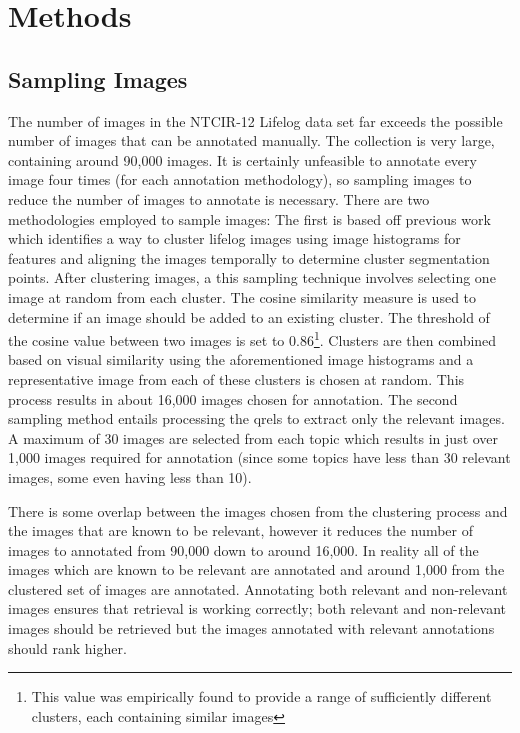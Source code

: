 \chapter{Methods}

\section{Sampling Images}

The number of images in the NTCIR-12 Lifelog data set far exceeds the possible number of images that can be annotated manually. The collection is very large, containing around 90,000 images. It is certainly unfeasible to annotate every image four times (for each annotation methodology), so sampling images to reduce the number of images to annotate is necessary. There are two methodologies employed to sample images: The first is based off previous work~\cite{scells2016qut} which identifies a way to cluster lifelog images using image histograms for features and aligning the images temporally to determine cluster segmentation points. After clustering images, a this sampling technique involves selecting one image at random from each cluster. The cosine similarity measure is used to determine if an image should be added to an existing cluster. The threshold of the cosine value between two images is set to 0.86\footnote{This value was empirically found to provide a range of sufficiently different clusters, each containing similar images}. Clusters are then combined based on visual similarity using the aforementioned image histograms and a representative image from each of these clusters is chosen at random. This process results in about 16,000 images chosen for annotation. The second sampling method entails processing the qrels to extract only the relevant images. A maximum of 30 images are selected from each topic which results in just over 1,000 images required for annotation (since some topics have less than 30 relevant images, some even having less than 10).

There is some overlap between the images chosen from the clustering process and the images that are known to be relevant, however it reduces the number of images to annotated from 90,000 down to around 16,000. In reality all of the images which are known to be relevant are annotated and around 1,000 from the clustered set of images are annotated. Annotating both relevant and non-relevant images ensures that retrieval is working correctly; both relevant and non-relevant images should be retrieved but the images annotated with relevant annotations should rank higher.

